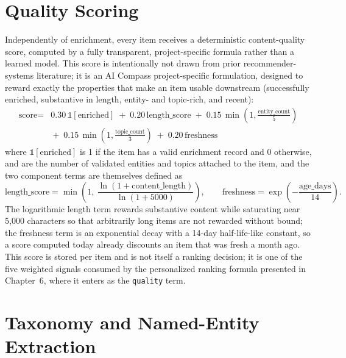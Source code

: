 \section{Quality Scoring}
\label{sec:quality-score}

Independently of enrichment, every item receives a deterministic content-quality score, computed by a fully transparent, project-specific formula rather than a learned model. This score is intentionally not drawn from prior recommender-systems literature; it is an AI Compass project-specific formulation, designed to reward exactly the properties that make an item usable downstream (successfully enriched, substantive in length, entity- and topic-rich, and recent):
\begin{equation}
\label{eq:quality-score}
\begin{split}
\text{score} = {}& 0.30\,\mathbb{1}[\text{enriched}] \;+\; 0.20\,\text{length\_score} \;+\; 0.15\,\min\!\left(1,\tfrac{\text{entity\_count}}{5}\right) \\
& {}+\; 0.15\,\min\!\left(1,\tfrac{\text{topic\_count}}{3}\right) \;+\; 0.20\,\text{freshness}
\end{split}
\end{equation}
where $\mathbb{1}[\text{enriched}]$ is 1 if the item has a valid enrichment record and 0 otherwise,  and  are the number of validated entities and topics attached to the item, and the two component terms are themselves defined as
\begin{equation}
\label{eq:quality-components}
\text{length\_score} = \min\!\left(1,\ \frac{\ln(1+\text{content\_length})}{\ln(1+5000)}\right), \qquad
\text{freshness} = \exp\!\left(-\frac{\text{age\_days}}{14}\right).
\end{equation}
The logarithmic length term rewards substantive content while saturating near 5,000 characters so that arbitrarily long items are not rewarded without bound; the freshness term is an exponential decay with a 14-day half-life-like constant, so a score computed today already discounts an item that was fresh a month ago. This score is stored per item and is not itself a ranking decision; it is one of the five weighted signals consumed by the personalized ranking formula presented in Chapter~6, where it enters as the \texttt{quality} term.

\section{Taxonomy and Named-Entity Extraction}
\label{sec:taxonomy}

